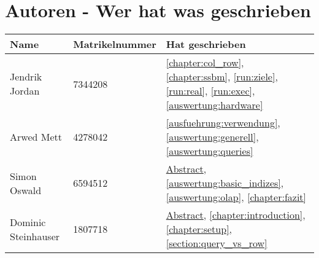 \chapter{Autoren - Wer hat was geschrieben}
\begin{table}[H]
	\centering
	\begin{tabularx}{\textwidth}{llX}
		\toprule
		Name                &	Matrikelnummer  & Hat geschrieben \\
		\toprule
		Jendrik Jordan      &   7344208         & \autoref{chapter:col_row}, \autoref{chapter:ssbm}, \autoref{run:ziele}, \autoref{run:real}, \autoref{run:exec}, \autoref{auswertung:hardware} \\
		Arwed Mett          &   4278042         & \autoref{ausfuehrung:verwendung}, \autoref{auswertung:generell}, \autoref{auswertung:queries} \\
		Simon Oswald        &   6594512         & \hyperref[abstract]{Abstract}, \autoref{auswertung:basic_indizes}, \autoref{auswertung:olap}, \autoref{chapter:fazit} \\
		Dominic Steinhauser &   1807718         & \hyperref[abstract]{Abstract}, \autoref{chapter:introduction}, \autoref{chapter:setup}, \autoref{section:query_vs_row} \\
		\bottomrule
	\end{tabularx}
	\label{tab:autoren}
\end{table}